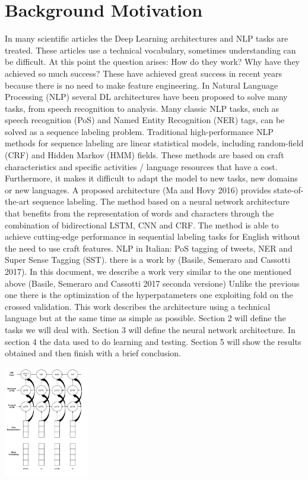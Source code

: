 \documentclass[twocolumn,10pt]{wmrDoc}
\begin{document}
\section{Background Motivation}
In many scientific articles the Deep Learning architectures and NLP tasks are treated. These articles use a technical vocabulary, sometimes understanding can be difficult. At this point the question arises: How do they work? Why have they achieved so much success? These have achieved great success in recent years because there is no need to make feature engineering. In Natural Language Processing (NLP) several DL architectures have been proposed to solve many tasks, from speech recognition to analysis. Many classic NLP tasks, such as speech recognition (PoS) and Named Entity Recognition (NER) tags, can be solved as a sequence labeling problem. Traditional high-performance NLP methods for sequence labeling are linear statistical models, including random-field (CRF) and Hidden Markov (HMM) fields. These methods are based on craft characteristics and specific activities / language resources that have a cost. Furthermore, it makes it difficult to adapt the model to new tasks, new domains or new languages.
A proposed architecture \cite{DBLP:journals/corr/MaH16}(Ma and Hovy 2016) provides state-of-the-art sequence labeling.
The method based on a neural network architecture that benefits from the representation of words and characters through the combination of bidirectional LSTM, CNN and CRF. The method is able to achieve cutting-edge performance in sequential labeling tasks for English without the need to use craft features.
NLP in Italian: PoS tagging of tweets, NER and Super Sense Tagging (SST). there is a work by \cite{DBLP:conf/clic-it/BasileSC172}(Basile, Semeraro and Cassotti 2017).
In this document, we describe a work very similar to the one mentioned above \cite{DBLP:conf/clic-it/BasileSC17}(Basile, Semeraro and Cassotti 2017 seconda versione) Unlike the previous one there is the optimization of the hyperpatameters one exploiting fold on the crossed validation. This work describes the architecture using a technical language but at the same time as simple as possible.
Section 2 will define the tasks we will deal with. Section 3 will define the neural network architecture.
In section 4 the data used to do learning and testing.
Section 5 will show the results obtained and then finish with a brief conclusion.


\includegraphics[width=0.28\textwidth]{figure/Architettura1.png}
\end{document}
